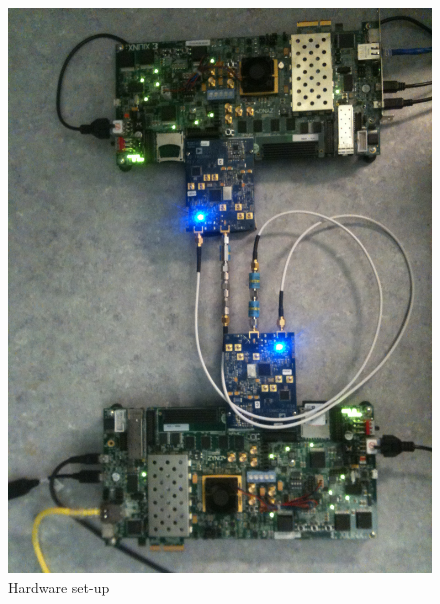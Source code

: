 \begin{figure}
\centering
\includegraphics[width=\textwidth]{content/fig/hardware_setup.JPG}
\caption{Hardware set-up}
\label{fig:hardware_setup}
\end{figure}

